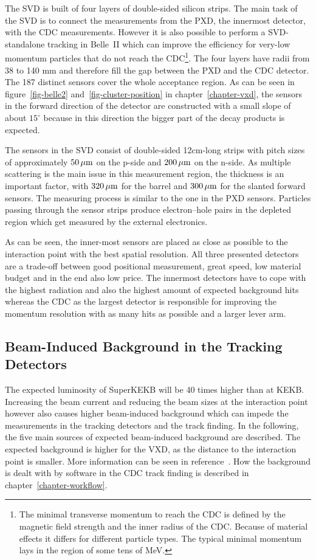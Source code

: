The SVD is built of four layers of double-sided silicon strips. The main task of the SVD is to connect the measurements from the PXD, the innermost detector, with the CDC measurements. However it is also possible to perform a SVD-standalone tracking in Belle~II which can improve the efficiency for very-low momentum particles that do not reach the CDC\footnote{The minimal transverse momentum to reach the CDC is defined by the magnetic field strength and the inner radius of the CDC. Because of material effects it differs for different particle types. The typical minimal momentum lays in the region of some tens of MeV.}. The four layers have radii from 38 to 140 mm and therefore fill the gap between the PXD and the CDC detector. The 187 distinct sensors cover the whole acceptance region. As can be seen in figure~\ref{fig-belle2} and~\ref{fig-cluster-position} in chapter~\ref{chapter-vxd}, the sensors in the forward direction of the detector are constructed with a small slope of about $15^\circ$ because in this direction the bigger part of the decay products is expected. 

The sensors in the SVD consist of double-sided 12cm-long strips with pitch sizes of approximately $\unit[50]{\mu m}$ on the p-side and $\unit[200]{\mu m}$ on the n-side. As multiple scattering is the main issue in this measurement region, the thickness is an important factor, with $\unit[320]{\mu m}$ for the barrel and $\unit[300]{\mu m}$ for the slanted forward sensors. The measuring process is similar to the one in the PXD sensors. Particles passing through the sensor strips produce electron--hole pairs in the depleted region which get measured by the external electronics. 

As can be seen, the inner-most sensors are placed as close as possible to the interaction point with the best spatial resolution. All three presented detectors are a trade-off between good positional measurement, great speed, low material budget and in the end also low price. The innermost detectors have to cope with the highest radiation and also the highest amount of expected background hits whereas the CDC as the largest detector is responsible for improving the momentum resolution with as many hits as possible and a larger lever arm.

\subsection{Beam-Induced Background in the Tracking Detectors}

The expected luminosity of SuperKEKB will be 40 times higher than at KEKB. Increasing the beam current and reducing the beam sizes at the interaction point however also causes higher beam-induced background which can impede the measurements in the tracking detectors and the track finding. In the following, the five main sources of expected beam-induced background are described. The expected background is higher for the VXD, as the distance to the interaction point is smaller. More information can be seen in reference~\cite{jakob}. How the background is dealt with by software in the CDC track finding is described in chapter~\ref{chapter-workflow}.

